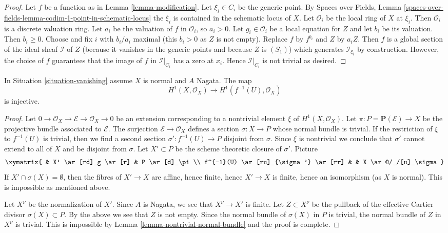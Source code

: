 \begin{proof}
Let $f$ be a function as in Lemma \ref{lemma-modification}.
Let $\xi_i \in C_i$ be the generic point. By
Spaces over Fields, Lemma
\ref{spaces-over-fields-lemma-codim-1-point-in-schematic-locus}
the $\xi_i$ is contained in the schematic locus of $X$. Let
$\mathcal{O}_i$ be the local ring of $X$ at $\xi_i$. Then $\mathcal{O}_i$
is a discrete valuation ring. Let $a_i$ be the valuation of
$f$ in $\mathcal{O}_i$, so $a_i > 0$. Let $g_i \in \mathcal{O}_i$ be a local
equation for $Z$ and let $b_i$ be its valuation. Then $b_i \geq 0$.
Choose and fix $i$ with $b_i/a_i$ maximal (this $b_i > 0$ as
$Z$ is not empty). Replace $f$ by $f^{b_i}$ and $Z$ by $a_iZ$.
Then $f$ is a global section of the ideal sheaf $\mathcal{I}$
of $Z$ (because it vanishes in the generic points and because
$Z$ is $(S_1)$) which generates $\mathcal{I}_{\xi_i}$ by construction.
However, the choice of $f$ guarantees that the image of $f$ in
$\mathcal{I}|_{C_i}$ has a zero at $x_i$. Hence $\mathcal{I}|_{C_i}$
is not trivial as desired.
\end{proof}

\begin{lemma}
\label{lemma-H1-injective}
In Situation \ref{situation-vanishing} assume $X$ is normal
and $A$ Nagata. The map
$$
H^1(X, \mathcal{O}_X) \longrightarrow H^1(f^{-1}(U), \mathcal{O}_X)
$$
is injective.
\end{lemma}

\begin{proof}
Let $0 \to \mathcal{O}_X \to \mathcal{E} \to \mathcal{O}_X \to 0$ be an
extension corresponding to a nontrivial element $\xi$ of
$H^1(X, \mathcal{O}_X)$. Let $\pi : P = \mathbf{P}(\mathcal{E}) \to X$
be the projective bundle associated to $\mathcal{E}$.
The surjection $\mathcal{E} \to \mathcal{O}_X$
defines a section $\sigma : X \to P$ whose normal bundle is trivial.
If the restriction of $\xi$ to $f^{-1}(U)$ is trivial, then we
find a second section $\sigma' : f^{-1}(U) \to P$ disjoint from $\sigma$.
Since $\xi$ is nontrivial we conclude that $\sigma'$ cannot extend
to all of $X$ and be disjoint from $\sigma$. Let $X' \subset P$ be the
scheme theoretic closure of $\sigma'$. Picture
$$
\xymatrix{
& X' \ar[rd]_g \ar[r] & P \ar[d]_\pi \\
f^{-1}(U) \ar[ru]_{\sigma'} \ar[rr] & & X \ar@/_/[u]_\sigma
}
$$
If $X' \cap \sigma(X) = \emptyset$, then the fibres of $X' \to X$
are affine, hence finite, hence $X' \to X$ is finite, hence an isomorphism
(as $X$ is normal). This is impossible as mentioned above.

\medskip\noindent
Let $X^\nu$ be the normalization of $X'$. Since $A$ is Nagata, we see
that $X^\nu \to X'$ is finite. Let $Z \subset X^\nu$ be the pullback
of the effective Cartier divisor $\sigma(X) \subset P$. By the above
we see that $Z$ is not empty. Since the normal
bundle of $\sigma(X)$ in $P$ is trivial, the normal bundle of $Z$
in $X^\nu$ is trivial. This is impossible by
Lemma \ref{lemma-nontrivial-normal-bundle}
and the proof is complete.
\end{proof}

